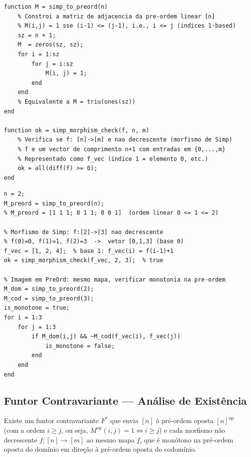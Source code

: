 \begin{lstlisting}[style=matlab, caption={[Funtor F: Simp -> PreOrd] Funtor $F: \mathbf{Simp} \to \mathbf{PreOrd}$ --- construção da pré-ordem de $[n]$}]
function M = simp_to_preord(n)
    % Constroi a matriz de adjacencia da pre-ordem linear [n]
    % M(i,j) = 1 sse (i-1) <= (j-1), i.e., i <= j (indices 1-based)
    sz = n + 1;
    M  = zeros(sz, sz);
    for i = 1:sz
        for j = i:sz
            M(i, j) = 1;
        end
    end
    % Equivalente a M = triu(ones(sz))
end

function ok = simp_morphism_check(f, n, m)
    % Verifica se f: [n]->[m] e nao decrescente (morfismo de Simp)
    % f e um vector de comprimento n+1 com entradas em {0,...,m}
    % Representado como f_vec (indice 1 = elemento 0, etc.)
    ok = all(diff(f) >= 0);
end
\end{lstlisting}

\begin{lstlisting}[style=matlab, caption={[Exemplo: F([2])] Exemplo: $F([2])$ e verificação de morfismo}]
n = 2;
M_preord = simp_to_preord(n);
% M_preord = [1 1 1; 0 1 1; 0 0 1]  (ordem linear 0 <= 1 <= 2)

% Morfismo de Simp: f:[2]->[3] nao decrescente
% f(0)=0, f(1)=1, f(2)=3  ->  vetor [0,1,3] (base 0)
f_vec = [1, 2, 4];  % base 1: f_vec(i) = f(i-1)+1
ok = simp_morphism_check(f_vec, 2, 3);  % true

% Imagem em PreOrd: mesmo mapa, verificar monotonia na pre-ordem
M_dom = simp_to_preord(2);
M_cod = simp_to_preord(3);
is_monotone = true;
for i = 1:3
    for j = 1:3
        if M_dom(i,j) && ~M_cod(f_vec(i), f_vec(j))
            is_monotone = false;
        end
    end
end
\end{lstlisting}

\subsection{Funtor Contravariante --- Análise de Existência}

\begin{proposition}
Existe um funtor contravariante $F^*$ que envia $[n]$ à pré-ordem oposta $[n]^{\mathrm{op}}$ (com a ordem $i \geq j$, ou seja, $M^{\mathrm{op}}(i,j) = 1 \iff i \geq j$) e cada morfismo não decrescente $f: [n] \to [m]$ ao mesmo mapa $f$, que é monótono na pré-ordem oposta do domínio em direção à pré-ordem oposta do codomínio.
\end{proposition}

